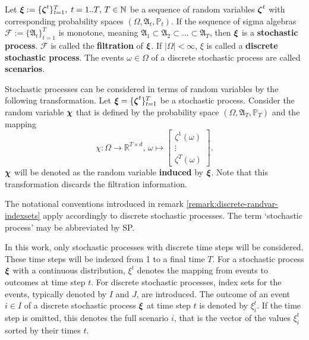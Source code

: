 \begin{definition}
\label{def:stochastic_process}
  Let $\boldsymbol\xi:=\{\boldsymbol\zeta^t\}_{t=1}^T,\; t=1..T,\, T\in\mathbb{N}$ be a sequence of random variables $\boldsymbol\zeta^t$ with corresponding probability spaces $(\Omega, \mathfrak{A}_t, \mathbb{P}_t)$.
  If the sequence of sigma algebras $\mathcal{F}:=\{\mathfrak{A}_t\}_{t=1}^T$ is monotone, meaning $\mathfrak{A}_1\subset\mathfrak{A}_2\subset\ldots\subset\mathfrak{A}_T$, then $\boldsymbol\xi$ is a \textbf{stochastic process}.
  $\mathcal{F}$ is called the \textbf{filtration} of $\boldsymbol\xi$.
  If $|\Omega|<\infty$, $\xi$ is called a \textbf{discrete stochastic process}.
  The events $\omega\in\Omega$ of a discrete stochastic process are called \textbf{scenarios}.
\end{definition}
\begin{remark}
  \label{remark:stochproc-as-randvar}
  Stochastic processes can be considered in terms of random variables by the following transformation.
  Let $\boldsymbol\xi = \{\boldsymbol\zeta^t\}_{t=1}^T$ be a stochastic process.
  Consider the random variable $\boldsymbol\chi$ that is defined by the probability space $(\Omega, \mathfrak{A}_T, \mathbb{P}_T)$ and the mapping \[\chi:\Omega\rightarrow \mathbb{R}^{T\times d},\,\omega\mapsto\left[\begin{array}{c}\zeta^1(\omega)\\\vdots\\\zeta^T(\omega)\end{array}\right].\]
  $\boldsymbol\chi$ will be denoted as the random variable \textbf{induced} by $\boldsymbol\xi$.
  Note that this transformation discards the filtration information.

  The notational conventions introduced in remark \ref{remark:discrete-randvar-indexsets} apply accordingly to discrete stochastic processes.
  The term `stochastic process' may be abbreviated by SP.
\end{remark}
\begin{remark}
In this work, only stochastic processes with discrete time steps will be considered.
These time steps will be indexed from 1 to a final time $T$.
For a stochastic process $\boldsymbol\xi$ with a continuous distribution, $\xi^t$ denotes the mapping from events to outcomes at time step $t$.
For discrete stochastic processes, index sets for the events, typically denoted by $I$ and $J$, are introduced.
The outcome of an event $i\in I$ of a discrete stochastic process $\boldsymbol\xi$ at time step $t$ is denoted by $\xi_i^t$.
If the time step is omitted, this denotes the full scenario $i$, that is the vector of the values $\xi_i^t$ sorted by their times $t$.
\end{remark}
